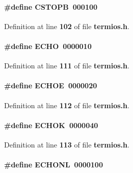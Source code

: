 \paragraph[{C\+S\+T\+O\+PB}]{\setlength{\rightskip}{0pt plus 5cm}\#define C\+S\+T\+O\+PB~000100}\label{termios_8h_a61e9f563e0f9533dc9cf221f427f6d1a}


Definition at line {\bf 102} of file {\bf termios.\+h}.

\paragraph[{E\+C\+HO}]{\setlength{\rightskip}{0pt plus 5cm}\#define E\+C\+HO~0000010}\label{termios_8h_aad1dc60a04a1d8cfc8b3ded13601e361}


Definition at line {\bf 111} of file {\bf termios.\+h}.

\paragraph[{E\+C\+H\+OE}]{\setlength{\rightskip}{0pt plus 5cm}\#define E\+C\+H\+OE~0000020}\label{termios_8h_aac931d3ce0dfc4578f76879ed095ecd7}


Definition at line {\bf 112} of file {\bf termios.\+h}.

\paragraph[{E\+C\+H\+OK}]{\setlength{\rightskip}{0pt plus 5cm}\#define E\+C\+H\+OK~0000040}\label{termios_8h_a6695c16777cf8a5211cfba9a23d45985}


Definition at line {\bf 113} of file {\bf termios.\+h}.

\paragraph[{E\+C\+H\+O\+NL}]{\setlength{\rightskip}{0pt plus 5cm}\#define E\+C\+H\+O\+NL~0000100}\label{termios_8h_ad99516e614e3aa680dfc0052085de40a}


